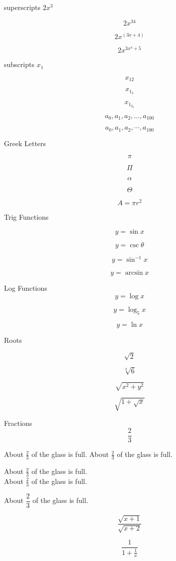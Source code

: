 \documentclass[11pt]{article}
\begin{document}
superscripts $2x^3$

 $$2x^{34}$$

$$2x^{(3x+4)}$$

$$2x^{3x^4+5}$$

\vspace{0.5cm}
subscripts $x_1$

$$x_{12}$$

$$x_{1_2}$$

$$x_{1_{2_3}}$$

$$a_0,a_1,a_2,\ldots,a_100$$

$$a_0,a_1,a_2,\cdots,a_100$$

Greek Letters

$$\pi$$

$$\Pi$$

$$\alpha$$

$$\Theta$$

$$A=\pi r^2$$

Trig Functions

$$y=\sin x$$

$$y=\csc \theta$$

$$y=\sin^{-1}x$$

$$y=\arcsin x$$

Log Functions
$$y=\log x$$

$$y=\log_5 x$$

$$y=\ln x$$

Roots

$$\sqrt{2}$$

$$\sqrt[3]{6}$$

$$\sqrt{x^2 + y^2}$$

$$\sqrt{  1+\sqrt{x}}$$

Fractions
$$\frac{2}{3}$$

About $\frac{2}{3}$ of the glass is full.
About $\displaystyle\frac{2}{3}$ of the glass is full.

\vspace{0.5cm}
About $\frac{2}{3}$ of the glass is full.\\[16pt]
About $\displaystyle\frac{2}{3}$ of the glass is full.

\vspace{0.5cm}
About $\dfrac{2}{3}$ of the glass is full.

$$\frac{\sqrt{x+1}}{\sqrt{x+2}}$$

$$\frac{1}{1+\frac{1}{x}}$$
\end{document}

